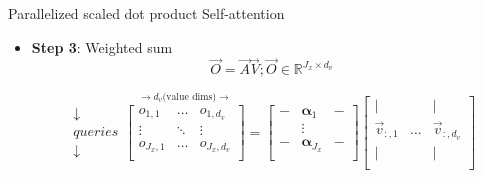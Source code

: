 
\begin{vbframe}{Parallelized scaled dot product Self-attention}

\vfill

\begin{itemize}
\item \textbf{Step 3}: Weighted sum
$$\vec {O} = \vec {A} \vec {V}; \vec O \in \mathbb{R}^{J_x \times d_v}$$

$$
\begin{matrix} \downarrow \\ queries \\ \downarrow \end{matrix}
	\overset{\rightarrow d_v \text{(value dims)} \rightarrow}{
\begin{bmatrix}
o_{1,1} & \ldots & o_{1,d_v} \\
\vdots & \ddots & \vdots \\
o_{J_x,1} & \ldots & o_{J_x,d_v} \\
\end{bmatrix}} =
\begin{bmatrix} 
- & \boldsymbol \alpha_1  & -  \\
& \vdots & \\
-  & \boldsymbol \alpha_{J_x}  &  -  \\
\end{bmatrix}  
\begin{bmatrix} 
\lvert &  & \lvert  \\
\vec {v}_{:,1} & \ldots & \vec {v}_{:,d_v} \\
\lvert &  & \lvert  \\
\end{bmatrix}
$$
\end{itemize}

\vfill

\end{vbframe}


